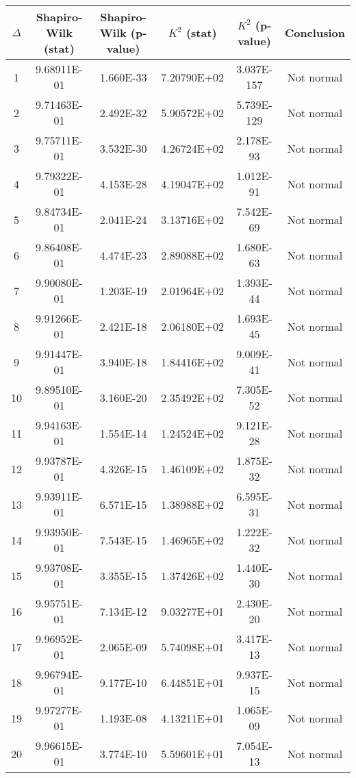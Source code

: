 \begin{table}[h]
	\begin{tabular}{|c|c|c|c|c|c|}
		\hline
		$\Delta$ &  Shapiro-Wilk (stat) & Shapiro-Wilk (p-value) & $K^2$ (stat) & $K^2$ (p-value) & Conclusion\\\hline
		\hline
		1 & 9.68911E-01 & 1.660E-33 & 7.20790E+02 & 3.037E-157 & Not normal\\\hline
		2 & 9.71463E-01 & 2.492E-32 & 5.90572E+02 & 5.739E-129 & Not normal\\\hline
		3 & 9.75711E-01 & 3.532E-30 & 4.26724E+02 & 2.178E-93 & Not normal\\\hline
		4 & 9.79322E-01 & 4.153E-28 & 4.19047E+02 & 1.012E-91 & Not normal\\\hline
		5 & 9.84734E-01 & 2.041E-24 & 3.13716E+02 & 7.542E-69 & Not normal\\\hline
		6 & 9.86408E-01 & 4.474E-23 & 2.89088E+02 & 1.680E-63 & Not normal\\\hline
		7 & 9.90080E-01 & 1.203E-19 & 2.01964E+02 & 1.393E-44 & Not normal\\\hline
		8 & 9.91266E-01 & 2.421E-18 & 2.06180E+02 & 1.693E-45 & Not normal\\\hline
		9 & 9.91447E-01 & 3.940E-18 & 1.84416E+02 & 9.009E-41 & Not normal\\\hline
		10 & 9.89510E-01 & 3.160E-20 & 2.35492E+02 & 7.305E-52 & Not normal\\\hline
		11 & 9.94163E-01 & 1.554E-14 & 1.24524E+02 & 9.121E-28 & Not normal\\\hline
		12 & 9.93787E-01 & 4.326E-15 & 1.46109E+02 & 1.875E-32 & Not normal\\\hline
		13 & 9.93911E-01 & 6.571E-15 & 1.38988E+02 & 6.595E-31 & Not normal\\\hline
		14 & 9.93950E-01 & 7.543E-15 & 1.46965E+02 & 1.222E-32 & Not normal\\\hline
		15 & 9.93708E-01 & 3.355E-15 & 1.37426E+02 & 1.440E-30 & Not normal\\\hline
		16 & 9.95751E-01 & 7.134E-12 & 9.03277E+01 & 2.430E-20 & Not normal\\\hline
		17 & 9.96952E-01 & 2.065E-09 & 5.74098E+01 & 3.417E-13 & Not normal\\\hline
		18 & 9.96794E-01 & 9.177E-10 & 6.44851E+01 & 9.937E-15 & Not normal\\\hline
		19 & 9.97277E-01 & 1.193E-08 & 4.13211E+01 & 1.065E-09 & Not normal\\\hline
		20 & 9.96615E-01 & 3.774E-10 & 5.59601E+01 & 7.054E-13 & Not normal\\\hline

\end{tabular}
\end{table}

